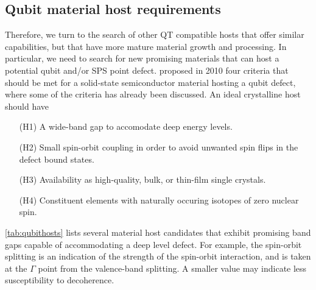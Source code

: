 \subsection{Qubit material host requirements}
\label{ssec:qubit-material-host-requirements}
Therefore, we turn to the search of other QT compatible hosts that offer similar capabilities, but that have more mature material growth and processing. In particular, we need to search for new promising materials that can host a potential qubit and/or SPS point defect. \citeauthor{Weber2010} \cite{Weber2010} proposed in 2010 four criteria that should be met for a solid-state semiconductor material hosting a qubit defect, where some of the criteria has already been discussed. An ideal crystalline host should have \cite{Weber2010}
\begin{itemize}
  \item[(H1)] A wide-band gap to accomodate deep energy levels.
  \item[(H2)] Small spin-orbit coupling in order to avoid unwanted spin flips in the defect bound states.
  \item[(H3)] Availability as high-quality, bulk, or thin-film single crystals.
  \item[(H4)] Constituent elements with naturally occuring isotopes of zero nuclear spin.
\end{itemize}


\noindent \autoref{tab:qubithosts} lists several material host candidates that exhibit promising band gaps capable of accommodating a deep level defect. For example, the spin-orbit splitting is an indication of the strength of the spin-orbit interaction, and is taken at the $\Gamma$ point from the valence-band splitting. A smaller value may indicate less susceptibility to decoherence.

